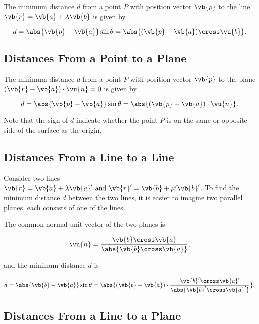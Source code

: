 \documentclass[a4paper,12pt]{report}
\begin{document}
The minimum distance \(d\) from a point \(P\) with position vector \(\vb{p} \) to the line \(\vb{r} = \vb{a} + \lambda \vb{b} \) is given by 

\begin{equation}
    d = \abs{\vb{p} -\vb{a} }\sin \theta = \abs{(\vb{p} -\vb{a} )\cross \vu{b}  }. 
\end{equation}

\subsection{Distances From a Point to a Plane}

The minimum distance \(d\) from a point \(P\) with position vector \(\vb{p} \) to the plane \((\vb{r} - \vb{a} )\cdot \vu{n} = 0\)  is given by 

\begin{equation}
    d = \abs{\vb{p} - \vb{a} }\sin \theta = \abs{(\vb{p} -\vb{a} )\cdot \vu{n} }  .  \label{pointplane} 
\end{equation}

Note that the sign of \(d\) indicate whether the point \(P\) is on the same or opposite side of the surface as the origin. 

\subsection{Distances From a Line to a Line}

Consider two lines \(\vb{r} = \vb{a} + \lambda \vb{a}' \text { and } \vb{r} ' = \vb{b} + \mu '\vb{b} '\). To find the minimum distance \(d\) between the two lines, it is easier to imagine two parallel planes, each consists of one of the lines.

The common normal unit vector of the two planes is 

\begin{equation}
    \vu{n} = \frac{\vb{b} \cross \vb{a} }{\abs{\vb{b} \cross \vb{a} } }, 
\end{equation}

and the minimum distance \(d\) is 

\begin{equation}
    d = \abs{\vb{b} - \vb{a} } \sin \theta = \abs{(\vb{b} - \vb{a} )\cdot \frac{\vb{b}' \cross \vb{a}' }{\abs{\vb{b}' \cross \vb{a}' } }} .
\end{equation}

\subsection{Distances From a Line to a Plane}
\end{document}
